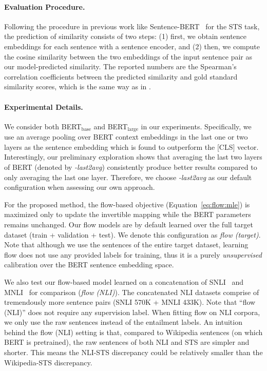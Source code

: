 \documentclass[11pt,a4paper]{article}
\begin{document}
\paragraph{Evaluation Procedure. }
Following the procedure in previous work like Sentence-BERT~\cite{reimers2019sentence} for the STS task, the prediction of similarity consists of two steps: (1) first, we obtain sentence embeddings for each sentence with a sentence encoder, and  
(2) then, we compute the cosine similarity between the two embeddings of the input sentence pair as our model-predicted similarity. The reported numbers are the Spearman's correlation coefficients between the predicted similarity and gold standard similarity scores, which is the same way as in \citep{reimers2019sentence}. 


\paragraph{Experimental Details. }
We consider both BERT$_{\text{base}}$ and BERT$_{\text{large}}$ in our experiments. Specifically, we use an average pooling over BERT context embeddings in the last one or two layers as the sentence embedding which is found to outperform the [CLS] vector. Interestingly, our preliminary exploration shows that averaging the last two layers of BERT (denoted by \textit{-last2avg}) consistently produce better results compared to only averaging the last one layer. Therefore, we choose \textit{-last2avg} as our default configuration when assessing our own approach.

For the proposed method, the flow-based objective (Equation~\ref{eq:flow:mle}) is maximized only to update the invertible mapping while the BERT parameters remains unchanged. Our flow models are by default learned over the full target dataset (train + validation + test).
We denote this configuration as \textit{flow (target)}. Note that although we use the sentences of the entire target dataset, learning flow does not use any provided labels for training, thus it is a purely \emph{unsupervised} calibration over the BERT sentence embedding space. 


We also test our flow-based model learned on a concatenation of SNLI~\citep{snli} and MNLI~\citep{mnli} for comparison (\emph{flow (NLI)}). The concatenated NLI datasets comprise of tremendously more sentence pairs (SNLI 570K + MNLI 433K). Note that ``flow (NLI)'' does not require any supervision label. When fitting flow on NLI corpora, we only use the raw sentences instead of the entailment labels. An intuition behind the flow (NLI) setting is that, compared to Wikipedia sentences (on which BERT is pretrained), the raw sentences of both NLI and STS are simpler and shorter. This means the NLI-STS discrepancy could be relatively smaller than the Wikipedia-STS discrepancy.
\end{document}
